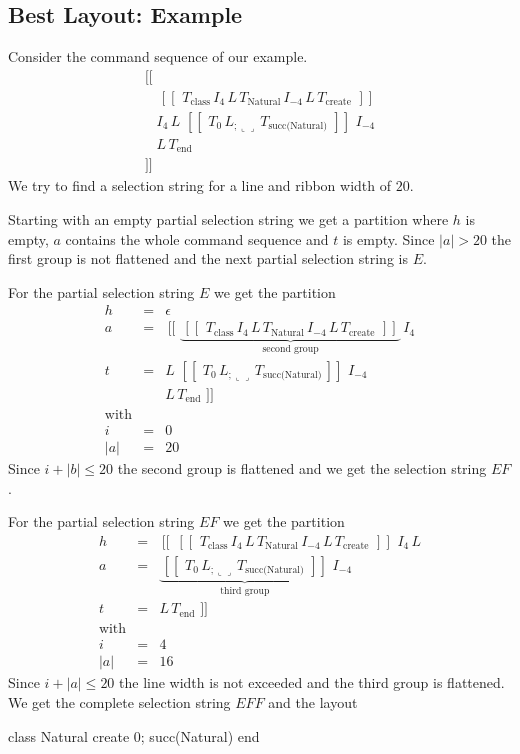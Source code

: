 \documentclass[12pt]{article}
\def\blank{\llcorner\!\!\lrcorner}
\def\class{\text{class}}
\def\create{\text{create}}
\def\kwend{\text{end}}
\def\GS{\,[\![\,}
\def\GE{\,]\!]\,}
\def\Natural{\text{Natural}}
\begin{document}
\subsection{Best Layout: Example}

Consider the command sequence of our example.
$$
\begin{array}{l}
  \GS \, \\
  \quad
  \GS \, T_\class\,
     I_4\, L\, T_\Natural\, I_{-4}\,
  L\, T_\create\, \GE
  \\
  \quad I_4\, L\,
  \GS\, T_0\, L_{;\blank}\, T_\text{succ(Natural)}\, \GE\,
  I_{-4} \\
  \quad L \, T_\kwend \, \\
  \GE
\end{array}
$$
%
We try to find a selection string for a line and ribbon width of $20$.

Starting with an empty partial selection string we get a partition where $h$
is empty, $a$ contains the whole command sequence and $t$ is empty. Since $|a|
> 20$ the first group is not flattened and the next partial selection string
is $E$.


For the partial selection string $E$ we get the partition
$$
\begin{array}{lll}
  h &=& \epsilon
  \\
  a &=& \GS \,
        \underbrace{
        \GS \, T_\class\,
        I_4\, L\, T_\Natural\, I_{-4}\, L \, T_\create\, \GE
        }_{\text{second group}} \, I_4
  \\
  t  & = &  L\,
           \GS\, T_0\, L_{;\blank}\, T_\text{succ(Natural)}
           \GE \, I_{-4}\, \\
    & & L \, T_\kwend \, \GE
  \\
  \text{with} \\
  i & = & 0
  \\
  |a| & = & 20 %
\end{array}
$$%
Since $i + |b| \le 20$ the second group is flattened and we get the selection
string $EF$.

For the partial selection string $EF$ we get the partition
$$
\begin{array}{lll}
  h &=& \GS \,
        \GS \, T_\class\,
        I_4\, L\, T_\Natural\, I_{-4}\, L \, T_\create\, \GE \, I_4\, L
  \\
  a &=& \underbrace{
        \GS \,T_0\, L_{;\blank}\, T_\text{succ(Natural)}\, \GE
        }_{\text{third group}}
        \, I_{-4}
  \\
  t & = & L \, T_\kwend \, \GE
  \\
  \text{with}
  \\
  i & = & 4
  \\
  |a| & = & 16%
\end{array}
$$%
Since $i + |a| \le 20$ the line width is not exceeded and the third group is
flattened. We get the complete selection string $E F F$ and the layout
\begin{alba}
    class Natural create
        0; succ(Natural)
    end
\end{alba}
\end{document}
